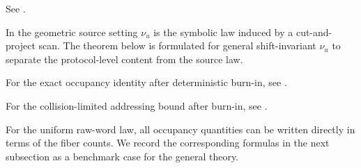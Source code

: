 \begin{definition}\label{def:collision}
See \cite[Definition~6.3]{MaZhang2026Nonlinearity}.
\end{definition}

\begin{remark}
In the geometric source setting $\nu_u$ is the symbolic law induced by a cut-and-project scan. The theorem below is formulated for general shift-invariant $\nu_u$ to separate the protocol-level content from the source law.
\end{remark}

\begin{theorem}\label{thm:exact-occupancy}
For the exact occupancy identity after deterministic burn-in, see
\cite[Theorem~6.5]{MaZhang2026Nonlinearity}.
\end{theorem}

\begin{corollary}\label{cor:collision-budget}
For the collision-limited addressing bound after burn-in, see
\cite[Corollary~6.6]{MaZhang2026Nonlinearity}.
\end{corollary}

For the uniform raw-word law, all occupancy quantities can be written directly in terms of the fiber counts. We record the corresponding formulas in the next subsection as a benchmark case for the general theory.
